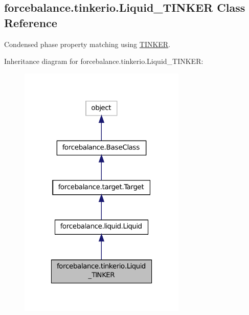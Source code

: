 \hypertarget{classforcebalance_1_1tinkerio_1_1Liquid__TINKER}{\subsection{forcebalance.\-tinkerio.\-Liquid\-\_\-\-T\-I\-N\-K\-E\-R Class Reference}
\label{classforcebalance_1_1tinkerio_1_1Liquid__TINKER}
}


Condensed phase property matching using \hyperlink{classforcebalance_1_1tinkerio_1_1TINKER}{T\-I\-N\-K\-E\-R}.  




Inheritance diagram for forcebalance.\-tinkerio.\-Liquid\-\_\-\-T\-I\-N\-K\-E\-R\-:
\nopagebreak
\begin{figure}[H]
\begin{center}
\leavevmode
\includegraphics[width=226pt]{classforcebalance_1_1tinkerio_1_1Liquid__TINKER__inherit__graph}
\end{center}
\end{figure}


